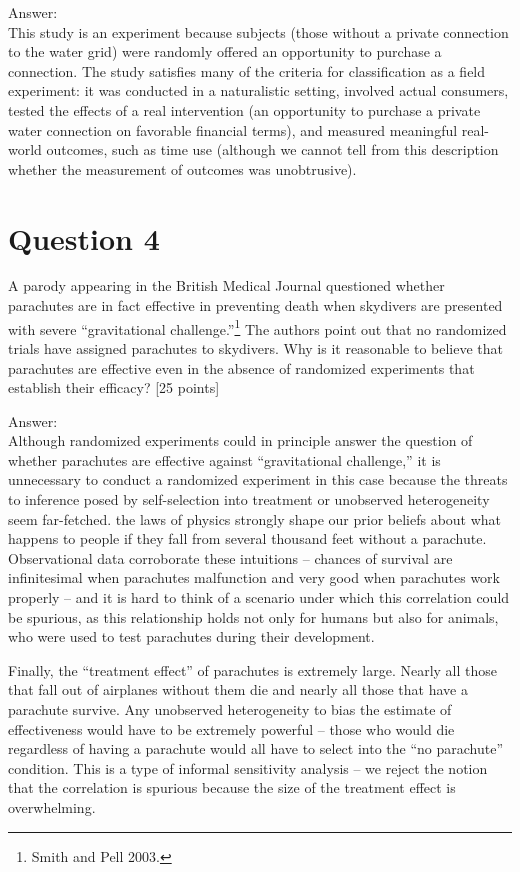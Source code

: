 \documentclass[11pt,notitlepage]{article}		%
\begin{document}
Answer:\\
This study is an experiment because subjects (those without a private connection to the water grid) were randomly offered an opportunity to purchase a connection. The study satisfies many of the criteria for classification as a field experiment: it was conducted in a naturalistic setting, involved actual consumers, tested the effects of a real intervention (an opportunity to purchase a private water connection on favorable financial terms), and measured meaningful real-world outcomes, such as time use (although we cannot tell from this description whether the measurement of outcomes was unobtrusive).  

\section*{Question 4}
A parody appearing in the British Medical Journal questioned whether parachutes are in fact effective in preventing death when skydivers are presented with severe ``gravitational challenge.''\footnote{Smith and Pell 2003.}  The authors point out that no randomized trials have assigned parachutes to skydivers. Why is it reasonable to believe that parachutes are effective even in the absence of randomized experiments that establish their efficacy?  [25 points]

Answer:\\
Although randomized experiments could in principle answer the question of whether parachutes  are effective against ``gravitational challenge,'' it is unnecessary to conduct a randomized experiment in this case because the threats to inference posed by self-selection into treatment or unobserved heterogeneity seem far-fetched.  the laws of physics strongly shape our prior beliefs about what happens to people if they fall from several thousand feet without a parachute. Observational data corroborate these intuitions -- chances of survival are infinitesimal when parachutes malfunction and very good when parachutes work properly -- and it is hard to think of a scenario under which this correlation could be spurious, as this relationship holds not only for humans but also for animals, who were used to test parachutes during their development.  

Finally, the ``treatment effect'' of parachutes is extremely large. Nearly all those that fall out of airplanes without them die and nearly all those that have a parachute survive. Any unobserved heterogeneity to bias the estimate of effectiveness would have to be extremely powerful -- those who would die regardless of having a parachute would all have to select into the ``no parachute'' condition. This is a type of informal sensitivity analysis -- we reject the notion that the correlation is spurious because the size of the treatment effect is overwhelming.
\end{document}
